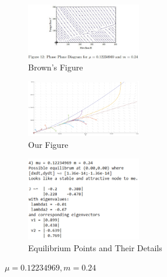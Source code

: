 \documentclass[a4paper,10pt]{article}
\begin{document}
\begin{figure}[H]
	\centering
	\begin{subfigure}[b]{0.4\textwidth}
		\centering
		\includegraphics[width=5cm]{Figure_12_4.jpg}%
		\caption{Brown's Figure\cite{Brown}}
	\end{subfigure}
	\hfill
	\begin{subfigure}[b]{0.4\textwidth}
		\centering
		\includegraphics[width=5cm]{FIgure_4_M483_Phase.png}%
		\caption{Our Figure}
	\end{subfigure}
	\begin{subfigure}[b]{0.4\textwidth}
		\centering
		\includegraphics[width = 5cm]{Project_App_Info_4.png}
		\caption{Equilibrium Points and Their Details}
	\end{subfigure}
	\caption{$\mu = 0.12234969, m = 0.24$}
\end{figure}
\end{document}
